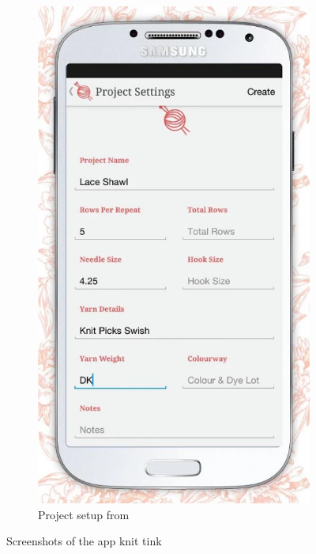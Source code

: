 \begin{figure}[H]
\begin{subfigure}[b]{0.4\textwidth}
      \centering
        \includegraphics[width=0.95\linewidth]{images/image11.png}
        \caption[
            Project setup 
        ]{Project setup from \protect\cite{knittink_project_setup}}
      \label{fig:knit_tink_project_setup}
    \end{subfigure}
  \caption[Screenshots of the app knit tink ]{Screenshots of the app knit tink}
\end{figure}

